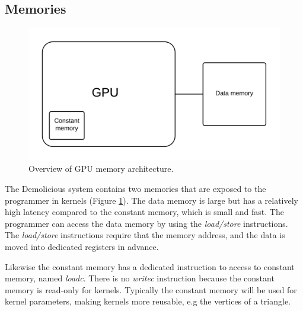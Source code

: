 \subsection{Memories}

\begin{figure}[H]
	\centering
	\includegraphics[width=\textwidth]{system_overview/diagrams/memory_overview.png}
	\caption{Overview of GPU memory architecture.}
	\label{fig:memory_overview}
\end{figure}
The Demolicious system contains two memories that are exposed to the programmer in kernels (Figure \ref{fig:memory_overview}).
The data memory is large but has a relatively high latency compared to the constant memory, which is small and fast.
The programmer can access the data memory by using the \textit{load/store} instructions. 
The \textit{load/store} instructions require that the memory address,
and the data is moved into dedicated registers in advance. 

Likewise the constant memory has a dedicated instruction to access to constant memory, named \textit{loadc}.
There is no \textit{writec} instruction because the constant memory is read-only for kernels.
Typically the constant memory will be used for kernel parameters, making kernels more reusable, e.g the vertices of a triangle.


